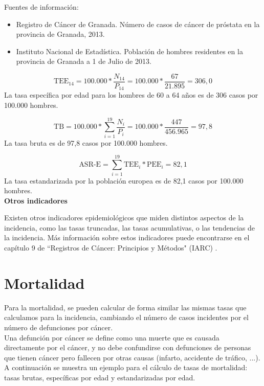 \vspace{-0.5cm}
\noindent Fuentes de información:
\begin{itemize}
	\item Registro de Cáncer de Granada. Número de casos de cáncer de próstata en la provincia de Granada, 2013.
	\item Instituto Nacional de Estadística. Población de hombres residentes en la provincia de Granada a 1 de Julio de 2013.
\end{itemize}

$$\text{TEE}_{14} = 100.000 * \dfrac{N_{14}}{P_{14}} = 100.000 *  \frac{67}{21.895}  = 306,0 $$ La tasa específica por edad para los hombres de 60 a 64 años es de 306 casos por 100.000 hombres.

$$\text{TB} = 100.000 * \sum_{i=1}^{19} \dfrac{N_i}{P_i} = 100.000 *  \frac{447}{456.965}  = 97,8 $$ La tasa bruta es de 97,8 casos por 100.000 hombres.

$$\text{ASR-E} = \sum_{i=1}^{19} \text{TEE}_i * \text{PEE}_i  = 82,1$$ La tasa estandarizada por la población europea es de 82,1 casos por 100.000 hombres. \\

\noindent \textbf{Otros indicadores}

\noindent Existen otros indicadores epidemiológicos que miden distintos aspectos de la incidencia, como las tasas truncadas, las tasas acumulativas, o las tendencias de la incidencia. Más información sobre estos indicadores puede encontrarse en el capítulo 9 de ``Registros de Cáncer: Principios y Métodos" (IARC) \cite{IARC1995}.

\section{Mortalidad}

Para la mortalidad, se pueden calcular de forma similar las mismas tasas que calculamos para la incidencia, cambiando el número de casos incidentes por el número de defunciones por cáncer.\\

Una defunción por cáncer se define como una muerte que es causada directamente por el cáncer, y no debe confundirse con defunciones de personas que tienen cáncer pero fallecen por otras causas (infarto, accidente de tráfico, ...).\\

A continuación se muestra un ejemplo para el cálculo de tasas de mortalidad: tasas brutas, específicas por edad y estandarizadas por edad.\\

